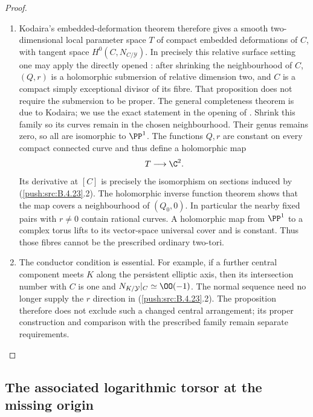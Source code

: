 \begin{proof}
\begin{enumerate}[label=\arabic*.,leftmargin=*]
\item Kodaira's embedded-deformation theorem therefore gives a
smooth two-dimensional local parameter space $T$ of
compact embedded deformations of $C$, with tangent space
$H^0(C,N_{C/\mathcal Y})$. In precisely this relative
surface setting one may apply the directly opened
\citet[Proposition 2.3 and its proof, pp.~6--7 of the
original preprint]{DlousskyTeleman2012AB}: after shrinking
the neighbourhood of $C$, $(Q,r)$ is a holomorphic
submersion of relative dimension two, and $C$ is a
compact simply exceptional divisor of its fibre.
That proposition does not require the submersion to be
proper. The general completeness theorem is due to Kodaira; we use the exact statement in the opening of \citet{Merkulov1995D}.
Shrink this family so its curves
remain in the chosen neighbourhood. Their genus remains
zero, so all are isomorphic to $\PP^1$.
The functions $Q,r$ are constant on every compact
connected curve and thus define a holomorphic map
\[
 T\longrightarrow\C^2.
\]
Its derivative at $[C]$ is precisely the isomorphism on
sections induced by (\ref{push:src:B.4.23}.2). The holomorphic inverse
function theorem shows that the map covers a neighbourhood
of $(Q_0,0)$. In particular the nearby fixed pairs with
$r\ne0$ contain rational curves. A holomorphic map from
$\PP^1$ to a complex torus lifts to its vector-space
universal cover and is constant. Thus those fibres cannot
be the prescribed ordinary two-tori.

\item The conductor condition is essential. For example, if a
further central component meets $K$ along the persistent
elliptic axis, then its intersection number with $C$ is
one and $N_{K/\mathcal Y}|_C\simeq\OO(-1)$.
The normal sequence need no longer supply the $r$ direction
in (\ref{push:src:B.4.23}.2). The proposition therefore does not exclude
such a changed central arrangement; its proper construction
and comparison with the prescribed family remain separate
requirements.
\end{enumerate}
\end{proof}

\subsection{The associated logarithmic torsor at the missing origin}

